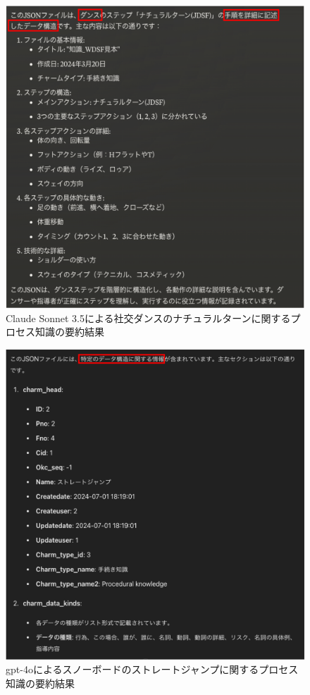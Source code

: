 \begin{figure}[htbp]
    \centering
    \includegraphics[width=1.0\linewidth]{./image/natural_turn_summarize_sonnet.png}
    \caption{Claude Sonnet 3.5による社交ダンスのナチュラルターンに関するプロセス知識の要約結果}
    \label{fig8}
\end{figure}

\begin{figure}[htbp]
    \centering
    \includegraphics[width=1.0\linewidth]{./image/straight_jump_summarize_gpt4o.png}
    \caption{gpt-4oによるスノーボードのストレートジャンプに関するプロセス知識の要約結果}
    \label{fig9}
\end{figure}

